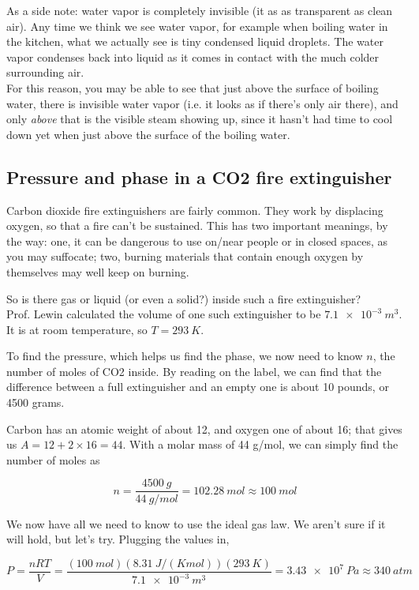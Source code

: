 As a side note: water vapor is completely invisible (it as as transparent as clean air). Any time we think we see water vapor, for example when boiling water in the kitchen, what we actually see is tiny condensed liquid droplets. The water vapor condenses back into liquid as it comes in contact with the much colder surrounding air.\\
For this reason, you may be able to see that just above the surface of boiling water, there is invisible water vapor (i.e. it looks as if there's only air there), and only \emph{above} that is the visible steam showing up, since it hasn't had time to cool down yet when just above the surface of the boiling water.

\subsection{Pressure and phase in a CO2 fire extinguisher}

Carbon dioxide fire extinguishers are fairly common. They work by displacing oxygen, so that a fire can't be sustained. This has two important meanings, by the way: one, it can be dangerous to use on/near people or in closed spaces, as you may suffocate; two, burning materials that contain enough oxygen by themselves may well keep on burning.
 
So is there gas or liquid (or even a solid?) inside such a fire extinguisher?\\
Prof. Lewin calculated the volume of one such extinguisher to be $\SI{7.1e-3}{m^3}$. It is at room temperature, so $T = \SI{293}{K}$.

To find the pressure, which helps us find the phase, we now need to know $n$, the number of moles of CO2 inside. By reading on the label, we can find that the difference between a full extinguisher and an empty one is about 10 pounds, or 4500 grams.

Carbon has an atomic weight of about 12, and oxygen one of about 16; that gives us $A = 12 + 2\times 16 = 44$. With a molar mass of 44 g/mol, we can simply find the number of moles as

\begin{equation}
n = \frac{\SI{4500}{g}}{\SI{44}{g/mol}} = \SI{102.28}{mol} \approx \SI{100}{mol}
\end{equation}

We now have all we need to know to use the ideal gas law. We aren't sure if it will hold, but let's try. Plugging the values in,

\begin{equation}
P = \frac{n R T}{V} = \frac{ (\SI{100}{mol})(\SI{8.31}{J/(K mol)})(\SI{293}{K})}{\SI{7.1e-3}{m^3}} = \SI{3.43e7}{Pa} \approx \SI{340}{atm}
\end{equation}

